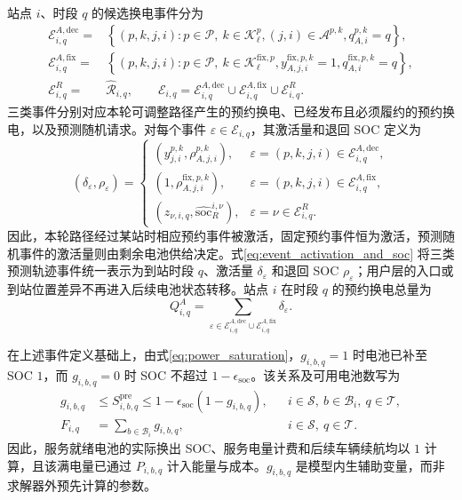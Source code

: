 \documentclass[12pt,a4paper,UTF8]{ctexart}
\begin{document}
站点 $i$、时段 $q$ 的候选换电事件分为
\begin{align}
\mathcal E_{i,q}^{A,\mathrm{dec}}
={}&\left\{(p,k,j,i):p\in\mathcal P,\ k\in\mathcal K_\ell^p,
(j,i)\in\mathcal A^{p,k},
q_{A,i}^{p,k}=q\right\},\\
\mathcal E_{i,q}^{A,\mathrm{fix}}
={}&\left\{(p,k,j,i):p\in\mathcal P,\ k\in\mathcal K_\ell^{\mathrm{fix},p},
y_{A,j,i}^{\mathrm{fix},p,k}=1,
q_{A,i}^{\mathrm{fix},p,k}=q\right\},\\
\mathcal E_{i,q}^{R}
={}&\widehat{\mathcal R}_{i,q},\qquad
\mathcal E_{i,q}
=\mathcal E_{i,q}^{A,\mathrm{dec}}
\cup\mathcal E_{i,q}^{A,\mathrm{fix}}
\cup\mathcal E_{i,q}^{R}.
\label{eq:swap_event_sets}
\end{align}
三类事件分别对应本轮可调整路径产生的预约换电、已经发布且必须履约的预约换电，以及预测随机请求。对每个事件
$\varepsilon\in\mathcal E_{i,q}$，其激活量和退回 SOC 定义为
\begin{equation}
(\delta_\varepsilon,\rho_\varepsilon)=
\begin{cases}
(y_{j,i}^{p,k},\rho_{A,j,i}^{p,k}),
&\varepsilon=(p,k,j,i)\in\mathcal E_{i,q}^{A,\mathrm{dec}},\\
(1,\rho_{A,j,i}^{\mathrm{fix},p,k}),
&\varepsilon=(p,k,j,i)\in\mathcal E_{i,q}^{A,\mathrm{fix}},\\
(z_{\nu,i,q},\widehat{\mathrm{soc}}_{R}^{i,\nu}),
&\varepsilon=\nu\in\mathcal E_{i,q}^{R}.
\end{cases}
\label{eq:event_activation_and_soc}
\end{equation}
因此，本轮路径经过某站时相应预约事件被激活，固定预约事件恒为激活，预测随机事件的激活量则由剩余电池供给决定。式\eqref{eq:event_activation_and_soc} 将三类预测轨迹事件统一表示为到站时段 $q$、激活量 $\delta_\varepsilon$ 和退回 SOC $\rho_\varepsilon$；用户层的入口或到站位置差异不再进入后续电池状态转移。站点 $i$ 在时段 $q$ 的预约换电总量为
\begin{equation}
Q_{i,q}^{A}
=
\sum_{\varepsilon\in
\mathcal E_{i,q}^{A,\mathrm{dec}}
\cup\mathcal E_{i,q}^{A,\mathrm{fix}}}
\delta_\varepsilon.
\label{eq:total_reservation_swap}
\end{equation}

在上述事件定义基础上，由式\eqref{eq:power_saturation}，$g_{i,b,q}=1$ 时电池已补至 SOC $1$，而 $g_{i,b,q}=0$ 时 SOC 不超过 $1-\epsilon_{\mathrm{soc}}$。该关系及可用电池数写为
\begin{subequations}
\label{eq:full_battery_count}
\begin{align}
g_{i,b,q}
&\le S_{i,b,q}^{\mathrm{pre}}
\le 1-\epsilon_{\mathrm{soc}}(1-g_{i,b,q}),
&&i\in\mathcal S,\ b\in\mathcal B_i,\ q\in\mathcal T,\label{eq:service_ready_relation}\\
F_{i,q}
&=\sum_{b\in\mathcal B_i}g_{i,b,q},
&&i\in\mathcal S,\ q\in\mathcal T.
\label{eq:available_battery_count}
\end{align}
\end{subequations}
因此，服务就绪电池的实际换出 SOC、服务电量计费和后续车辆续航均以 $1$ 计算，且该满电量已通过 $P_{i,b,q}$ 计入能量与成本。$g_{i,b,q}$ 是模型内生辅助变量，而非求解器外预先计算的参数。
\end{document}
